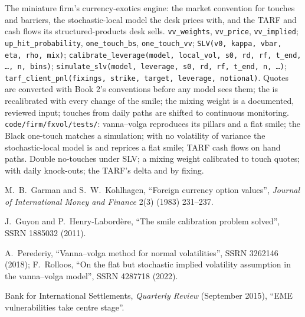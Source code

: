 \begin{build}
 The miniature firm's currency-exotics engine: the market convention for touches and barriers, the stochastic-local model the
desk prices with, and the TARF and  cash flows its structured-products desk sells.
 \texttt{vv\_weights}, \texttt{vv\_price}, \texttt{vv\_implied}; \texttt{up\_hit\_probability}, \texttt{one\_touch\_bs},
\texttt{one\_touch\_vv}; \texttt{SLV(v0, kappa, vbar, eta, rho, mix)}; \texttt{calibrate\_leverage(model, local\_vol, s0, rd, rf, t\_end,
\ldots, n, bins)}; \texttt{simulate\_slv(model, leverage, s0, rd, rf, t\_end, n, \ldots)}; \texttt{tarf\_client\_pnl(fixings, strike, target,
leverage, notional)}.
 Quotes are converted with Book 2's conventions before any model sees them; the  is recalibrated with every
change of the smile; the mixing weight is a documented, reviewed input; touches from daily paths are shifted to continuous monitoring.
 \texttt{code/firm/fxvol/tests/}: vanna--volga reproduces its pillars and a flat smile; the Black one-touch matches a
simulation; with no volatility of variance the stochastic-local model is  and reprices a flat smile; TARF cash flows on hand
paths.
 Double no-touches under SLV; a mixing weight calibrated to touch quotes;  with daily knock-outs; the TARF's delta and
 by fixing.
\end{build}

\begin{omsources}
\item M.~B.~Garman and S.~W.~Kohlhagen, ``Foreign currency option values'', \emph{Journal of International Money and Finance} 2(3) (1983)
231--237.
\item J.~Guyon and P.~Henry-Labord\`ere, ``The smile calibration problem solved'', SSRN 1885032 (2011).
\item A.~Perederiy, ``Vanna--volga method for normal volatilities'', SSRN 3262146 (2018); F.~Rolloos, ``On the flat but stochastic implied
volatility assumption in the vanna--volga model'', SSRN 4287718 (2022).
\item Bank for International Settlements, \emph{Quarterly Review} (September 2015), ``EME vulnerabilities take centre stage''.
\end{omsources}

